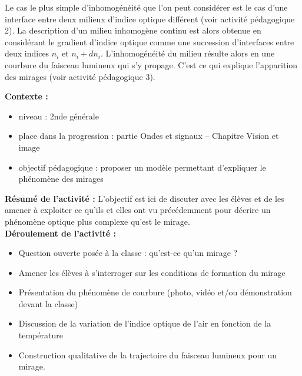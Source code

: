 \documentclass[a4paper,11pt]{article} %
\newenvironment{encart}[1]{%
	\begin{tcolorbox}
		[
		breakable, enhanced jigsaw, %
		arc = 1mm, %
		title = \textbf{#1}, %
		coltitle = white, %
		colbacktitle = blue, %
		colback = white, %
		colframe = blue %
		]
}{		
	\end{tcolorbox}
}
\begin{document}
	Le cas le plus simple d'inhomogénéité que l'on peut considérer est le cas d'une interface entre deux milieux d'indice optique différent (voir activité pédagogique 2). La description d'un milieu inhomogène continu est alors obtenue en considérant le gradient d'indice optique comme une succession d'interfaces entre deux indices $ n_i $ et $ n_i + dn_i $. L'inhomogénéité du milieu résulte alors en une courbure du faisceau lumineux qui s'y propage. C'est ce qui explique l'apparition des mirages (voir activité pédagogique 3).
	
	\begin{encart}{Activité pédagogique 3 : description qualitative d'un mirage}
		\textbf{Contexte :}
		\begin{itemize}
			\item niveau : 2nde générale
			\item place dans la progression : partie Ondes et signaux -- Chapitre Vision et image
			\item objectif pédagogique : proposer un modèle permettant d'expliquer le phénomène des mirages
		\end{itemize}
		\vspace{0.5cm}
		
		\textbf{Résumé de l'activité :}
		L'objectif est ici de discuter avec les élèves et de les amener à exploiter ce qu'ils et elles ont vu précédemment pour décrire un phénomène optique plus complexe qu'est le mirage.\\
		
		\textbf{Déroulement de l'activité :}
		\begin{itemize}
			\item Question ouverte posée à la classe : \og qu'est-ce qu'un mirage ?\fg{}
			\item Amener les élèves à s'interroger sur les conditions de formation du mirage
			\item Présentation du phénomène de courbure (photo, vidéo et/ou démonstration devant la classe)
			\item Discussion de la variation de l'indice optique de l'air en fonction de la température
			\item Construction qualitative de la trajectoire du faisceau lumineux pour un mirage.
		\end{itemize}
		
	\end{encart}
	
\end{document}
